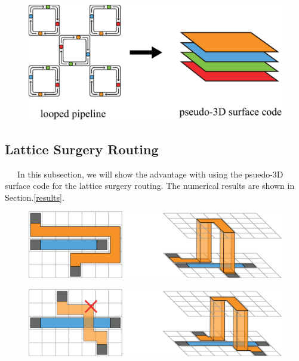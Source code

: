 \documentclass[a4paper,11pt]{ltjsarticle}
\begin{document}
{{        \begin{figure}[h]
            \centering
            \includegraphics[scale=0.30]{figure/pipeline_to_surface.eps}
            \vspace{0pt}\caption{}
            \label{pipeline_to_surface}
            \vspace{-10pt}
        \end{figure}
        
    }

    \subsection{Lattice Surgery Routing}{
        \ \ \ In this subsection, we will show the advantage with using the psuedo-3D surface code for the lattice surgery routing. The numerical results are shown in Section.\ref{results}. 

        \begin{figure}[h]
            \centering
            \includegraphics[scale=0.30]{figure/3D_advantage_distance.eps}
            \vspace{0pt}\caption{}
            \label{3D_advantage_distance}
            \vspace{-10pt}
        \end{figure}



        \begin{figure}[h]
            \centering
            \includegraphics[scale=0.30]{figure/3D_advantage_pararell.eps}
            \vspace{0pt}\caption{}
            \label{3D_advantage_pararell}
            \vspace{-10pt}
        \end{figure}
    }
}
\end{document}
